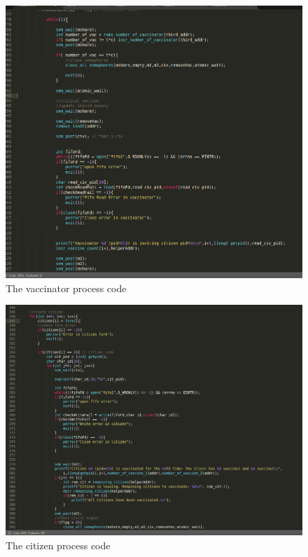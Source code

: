 \documentclass{article}
\begin{document}
\begin{figure}[h!]
\centering
\includegraphics[scale=0.4]{vaccinator.png}
\caption{The vaccinator process code}
\label{fig:nurse}
\end{figure}

\newpage

\begin{figure}[h!]
\centering
\includegraphics[scale=0.4]{citizen.png}
\caption{The citizen process code}
\label{fig:citizen}
\end{figure}
\end{document}
